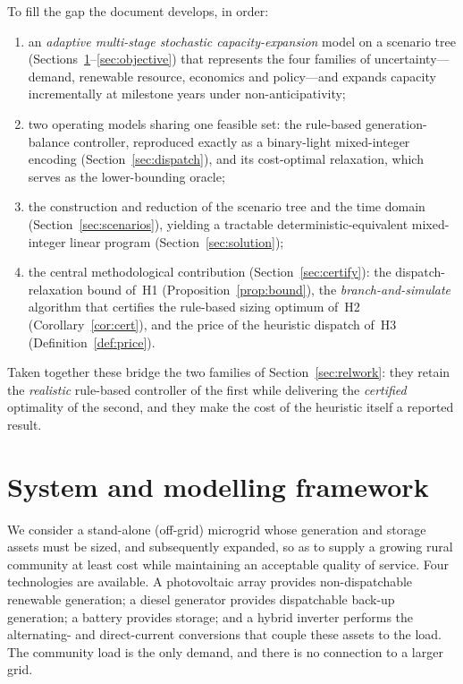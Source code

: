 \documentclass[11pt,a4paper]{article}
\theoremstyle{plain}
\theoremstyle{definition}
\begin{document}
To fill the gap the document develops, in order:
\begin{enumerate}[leftmargin=1.8em,itemsep=1pt]
  \item an \emph{adaptive multi-stage stochastic capacity-expansion} model on a scenario
  tree (Sections~\ref{sec:framework}--\ref{sec:objective}) that represents the four
  families of uncertainty---demand, renewable resource, economics and policy---and expands
  capacity incrementally at milestone years under non-anticipativity;
  \item two operating models sharing one feasible set: the rule-based generation-balance
  controller, reproduced exactly as a binary-light mixed-integer encoding
  (Section~\ref{sec:dispatch}), and its cost-optimal relaxation, which serves as the
  lower-bounding oracle;
  \item the construction and reduction of the scenario tree and the time domain
  (Section~\ref{sec:scenarios}), yielding a tractable deterministic-equivalent mixed-integer
  linear program (Section~\ref{sec:solution});
  \item the central methodological contribution (Section~\ref{sec:certify}): the
  dispatch-relaxation bound of~H1 (Proposition~\ref{prop:bound}), the
  \emph{branch-and-simulate} algorithm that certifies the rule-based sizing optimum
  of~H2 (Corollary~\ref{cor:cert}), and the price of the heuristic dispatch of~H3
  (Definition~\ref{def:price}).
\end{enumerate}
Taken together these bridge the two families of Section~\ref{sec:relwork}: they retain the
\emph{realistic} rule-based controller of the first while delivering the \emph{certified}
optimality of the second, and they make the cost of the heuristic itself a reported
result.

\section{System and modelling framework}
\label{sec:framework}

We consider a stand-alone (off-grid) microgrid whose generation and storage assets
must be sized, and subsequently expanded, so as to supply a growing rural community at
least cost while maintaining an acceptable quality of service. Four technologies are
available. A photovoltaic array provides non-dispatchable renewable generation; a
diesel generator provides dispatchable back-up generation; a
battery provides storage; and a hybrid inverter performs the alternating- and
direct-current conversions that couple these assets to the load. The community load is
the only demand, and there is no connection to a larger grid.
\end{document}
